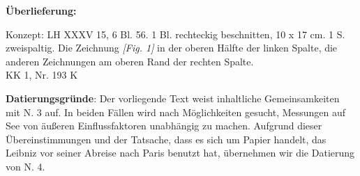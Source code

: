       
               
                \begin{ledgroupsized}[r]{120mm}
                \footnotesize 
                \pstart                
                \noindent\textbf{\"{U}berlieferung:}   
                \pend
                \end{ledgroupsized}
            
              
                            \begin{ledgroupsized}[r]{114mm}
                            \footnotesize 
                            \pstart \parindent -6mm
                            Konzept: LH XXXV 15, 6 Bl. 56. 1 Bl. rechteckig beschnitten, 10 x 17 cm. 1 S. zweispaltig. Die Zeichnung \textit{[Fig. 1]} in der oberen H\"{a}lfte der linken Spalte, die anderen Zeichnungen am oberen Rand der rechten Spalte.\\KK 1, Nr. 193 K \pend
                            \end{ledgroupsized}
                \vspace*{5mm}
                \begin{ledgroup}
                \footnotesize 
                \pstart
            \noindent\footnotesize{\textbf{Datierungsgr\"{u}nde}: Der vorliegende Text weist inhaltliche Gemeinsamkeiten mit N. 3 auf. In beiden F\"{a}llen wird nach M\"{o}glichkeiten gesucht, Messungen auf See von \"{a}ußeren Einflussfaktoren unabh\"{a}ngig zu machen. Aufgrund dieser \"{U}bereinstimmungen und der Tatsache, dass es sich um Papier handelt, das Leibniz vor seiner Abreise nach Paris benutzt hat, \"{u}bernehmen wir die Datierung von N. 4.}
                \pend
                \end{ledgroup}
            
